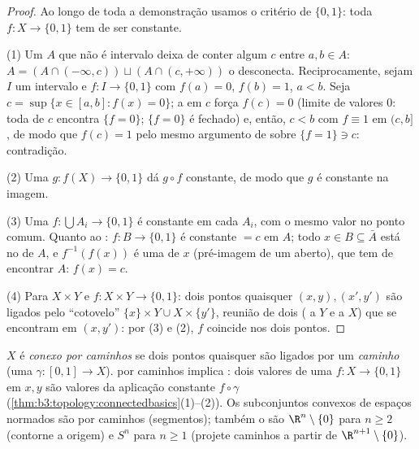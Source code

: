 \begin{proof}
Ao longo de toda a demonstração usamos o critério de $\{0,1\}$: toda $f \colon X \to
\{0,1\}$
 tem de ser constante.

(1) Um $A$ que não é intervalo deixa de conter algum $c$ entre
$a, b \in A$: $A = (A \cap (-\infty, c)) \sqcup (A \cap (c, +\infty))$ o desconecta. Reciprocamente, sejam $I$ um intervalo e
$f \colon I
\to \{0,1\}$  com $f(a) = 0$, $f(b) = 1$, $a < b$. Seja $c = \sup\{x \in [a,b] : f(x) = 0\}$; a
 em $c$ força $f(c) = 0$ (limite de valores $0$: toda
 de $c$ encontra $\{f = 0\}$; $\{f=0\}$ é fechado) e, então,
$c < b$ com $f \equiv 1$ em $(c, b]$, de modo que $f(c) = 1$ pelo mesmo
argumento de  sobre $\{f = 1\} \ni c$: contradição.

(2) Uma  $g \colon f(X) \to \{0,1\}$ dá $g \circ f$ constante, de modo que
$g$ é constante na imagem.

(3) Uma  $f\colon \bigcup A_i \to \{0,1\}$ é constante em cada $A_i$, com o
mesmo valor no ponto comum. Quanto ao : $f \colon B \to \{0,1\}$ é constante $= c$
em $A$; todo $x \in B \subseteq \bar A$ está no  de $A$, e $f^{-1}
(f(x))$ é uma
 de $x$ (pré-imagem de um aberto), que tem de encontrar
$A$: $f(x) = c$.

(4) Para $X \times Y$ e $f\colon X\times Y \to \{0,1\}$: dois pontos quaisquer $(x,y), (x',y')$ são ligados pelo
``cotovelo'' $\{x\}\times Y \cup X \times \{y'\}$, reunião de dois  ( a $Y$ e a
$X$) que se encontram em $(x, y')$: por (3) e (2), $f$ coincide nos
dois pontos.
\end{proof}

\begin{definition}\label{def:b3:topology:pathconnected}
$X$ é \emph{conexo por caminhos}
se dois pontos quaisquer são ligados por um \emph{caminho} (uma
 $\gamma
\colon [0,1] \to X$).  por caminhos implica : dois
valores de uma $f \colon X \to \{0,1\}$  em $x, y$ são valores da aplicação
constante $f\circ\gamma$ (\cref{thm:b3:topology:connectedbasics}(1)--(2)). Os subconjuntos convexos de
espaços normados são  por caminhos (segmentos); também o são
$\R^n
\setminus \{0\}$ para $n \geq 2$ (contorne a origem) e $S^n$ para $n \geq 1$ (projete
caminhos a partir de $\R^{n+1}\setminus
\{0\}$).
\end{definition}

